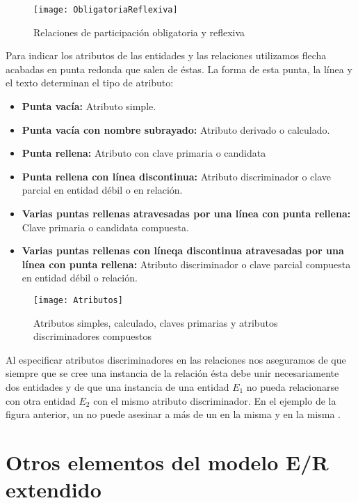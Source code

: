 \begin{figure}[h]
\begin{center}
	\texttt{[image: ObligatoriaReflexiva]}
\end{center}
\caption{Relaciones de participación obligatoria y reflexiva}
\end{figure}

Para indicar los atributos de las entidades y las relaciones utilizamos flecha acabadas en punta redonda que salen de éstas.
La forma de esta punta, la línea y el texto determinan el tipo de atributo:

\begin{itemize}
	\item\textbf{Punta vacía:} Atributo simple.
	\item\textbf{Punta vacía con nombre subrayado:} Atributo derivado o calculado.
	\item\textbf{Punta rellena:} Atributo con clave primaria o candidata
	\item\textbf{Punta rellena con línea discontinua:} Atributo discriminador o clave parcial en entidad débil o en relación.
	\item\textbf{Varias puntas rellenas atravesadas por una línea con punta rellena:} Clave primaria o candidata compuesta.
	\item\textbf{Varias puntas rellenas con líneqa discontinua atravesadas por una línea con punta rellena:} Atributo discriminador o clave parcial compuesta en entidad débil o relación.
\end{itemize}

\begin{figure}[h]
\begin{center}
	\texttt{[image: Atributos]}
\end{center}
\caption{Atributos simples, calculado, claves primarias y atributos discriminadores compuestos}
\end{figure}

Al especificar atributos discriminadores en las relaciones nos aseguramos de que siempre que se cree una instancia de la relación ésta debe unir necesariamente dos entidades y de que una instancia de una entidad $E_1$ no pueda relacionarse con otra entidad $E_2$ con el mismo atributo discriminador.
En el ejemplo de la figura anterior, un  no puede asesinar a más de un  en la misma  y en la misma .

\section{Otros elementos del modelo E/R extendido}

